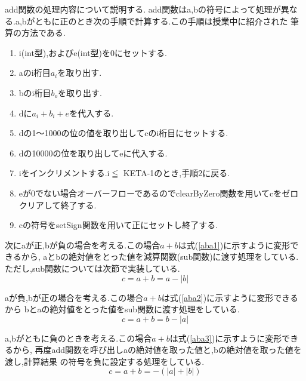 \documentclass[a4j] {jarticle}
\begin{document}
  add関数の処理内容について説明する.
  add関数はa,bの符号によって処理が異なる.a,bがともに正のとき次の手順で計算する.この手順は授業中に紹介された
  筆算の方法である.
  \begin{enumerate}
    \item i(int型),およびe(int型)を0にセットする.
    \item aのi桁目$a_i$を取り出す.
    \item bのi桁目$b_o$を取り出す.
    \item dに$a_i+b_i+e$を代入する.
    \item dの1～1000の位の値を取り出してcのi桁目にセットする.
    \item dの10000の位を取り出してeに代入する.
    \item iをインクリメントする.i$\leqq$ KETA-1のとき,手順2に戻る.
    \item eが0でない場合オーバーフローであるのでclearByZero関数を用いてcをゼロクリアして終了する.
    \item cの符号をsetSign関数を用いて正にセットし終了する.
  \end{enumerate}

  次にaが正,bが負の場合を考える.この場合$a+b$は式(\ref{aba1})に示すように変形できるから,
  aとbの絶対値をとった値を減算関数(sub関数)に渡す処理をしている.ただし,sub関数については次節で実装している.
  \begin{equation}
  c = a+b = a- |b|
  \label{aba1}
  \end{equation}

  aが負,bが正の場合を考える.この場合$a+b$は式(\ref{aba2})に示すように変形できるから
  bとaの絶対値をとった値をsub関数に渡す処理をしている.
  \begin{equation}
  c = a+b = b- |a|
  \label{aba2}
  \end{equation}

  a,bがともに負のときを考える.この場合$a+b$は式(\ref{aba3})に示すように変形できるから,
  再度add関数を呼び出しaの絶対値を取った値と,bの絶対値を取った値を渡し,計算結果
  の符号を負に設定する処理をしている.
  \begin{equation}
    c = a+b = - (|a|+|b|)
    \label{aba3}
    \end{equation}
\end{document}
